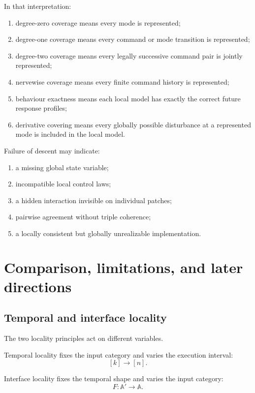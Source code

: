 In that interpretation:
\begin{enumerate}
    \item degree-zero coverage means every mode is represented;
    \item degree-one coverage means every command or mode transition is
    represented;
    \item degree-two coverage means every legally successive command pair is
    jointly represented;
    \item nervewise coverage means every finite command history is represented;
    \item behaviour exactness means each local model has exactly the correct
    future response profiles;
    \item derivative covering means every globally possible disturbance at a
    represented mode is included in the local model.
\end{enumerate}

Failure of descent may indicate:
\begin{enumerate}
    \item a missing global state variable;
    \item incompatible local control laws;
    \item a hidden interaction invisible on individual patches;
    \item pairwise agreement without triple coherence;
    \item a locally consistent but globally unrealizable implementation.
\end{enumerate}

\section{Comparison, limitations, and later directions}
\label{sec:comparison-limitations-interface-descent}

\subsection{Temporal and interface locality}
\label{subsec:comparison-temporal-interface-locality}

The two locality principles act on different variables.

Temporal locality fixes the input category and varies the execution interval:
\[
    [k]\to[n].
\]

Interface locality fixes the temporal shape and varies the input category:
\[
    F:\mathbb A'\to\mathbb A.
\]

